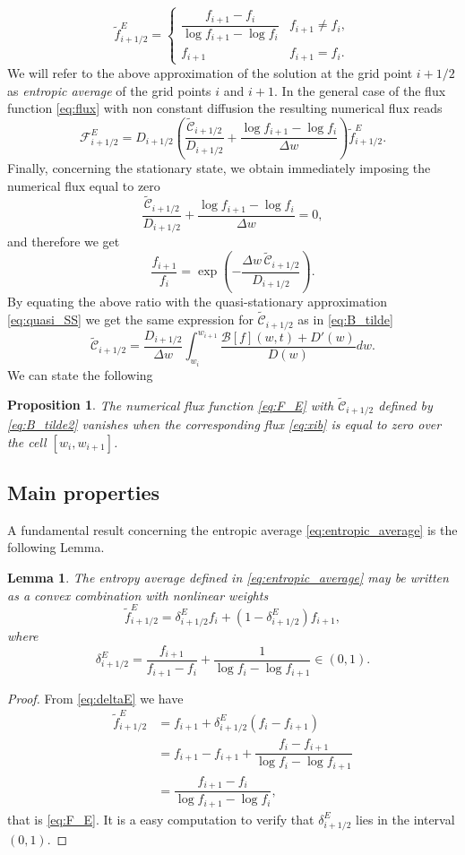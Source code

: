 \documentclass[a4paper]{article}
\newtheorem{proposition}{Proposition}
\newtheorem{lemma}{Lemma}
\theoremstyle{remark}\newtheorem{remark}{Remark}
\newcommand{\F}{\mathcal{F}}
\newcommand{\B}{\mathcal{B}}
\newcommand{\C}{\mathcal{C}}
\newcommand{\be}{\begin{equation}}
\newcommand{\ee}{\end{equation}}
\begin{document}
\be\label{eq:entropic_average}
 \tilde f^{E}_{i+1/2} =
 \begin{cases}
  \dfrac{f_{i+1}-f_i}{\log f_{i+1}-\log f_i} & f_{i+1}\ne f_i,\\
 f_{i+1} & f_{i+1}=f_i.
 \end{cases}\ee
 We will refer to the above approximation of the solution at the grid point $i+1/2$ as \emph{entropic average} of the grid points $i$ and $i+1$. In the general case of the flux function \eqref{eq:flux} with non constant diffusion the resulting numerical flux reads
\be\label{eq:F_E}
\F^E_{i+1/2} = D_{i+1/2}\left( \frac{\tilde {\C}_{i+1/2}}{D_{i+1/2}}+\dfrac{\log f_{i+1}-\log f_i}{\Delta w}  \right) \tilde f^E_{i+1/2}.
 \ee
Finally, concerning the stationary state, we obtain immediately imposing the numerical flux equal to zero
\[
\frac{\tilde {\C}_{i+1/2}}{D_{i+1/2}}+\dfrac{\log f_{i+1}-\log f_i}{\Delta w}=0,
\]  
and therefore we get
\[
\frac{f_{i+1}}{f_i} = \exp\left(-\frac{\Delta w\,\tilde {\C}_{i+1/2}}{D_{i+1/2}}\right).
\] 
By equating the above ratio with the quasi-stationary approximation \eqref{eq:quasi_SS} we get the same expression for $\tilde{\C}_{i+1/2}$ as in \eqref{eq:B_tilde}
\be\label{eq:B_tilde2}
\tilde{\C}_{i+1/2}=\dfrac{D_{i+1/2}}{\Delta w}\int_{w_i}^{w_{i+1}}\dfrac{\B[f](w,t)+D'(w)}{D(w)}dw.
\ee 
We can state the following 
\begin{proposition}
The numerical flux function \eqref{eq:F_E} with $\tilde{\C}_{i+1/2}$ defined by \eqref{eq:B_tilde2}  vanishes when the corresponding flux \eqref{eq:xib} is equal to zero over the cell $[w_i,w_{i+1}]$.  
\end{proposition}

\subsection{Main properties}
 
A fundamental result concerning the entropic average \eqref{eq:entropic_average} is the following Lemma.

 \begin{lemma}
The entropy average defined in \eqref{eq:entropic_average} may be written as a convex combination with nonlinear weights
\be
\tilde{f}^{E}_{i+1/2} = \delta_{i+1/2}^{E} f_i +(1-\delta_{i+1/2}^{E})f_{i+1},
\ee
where 
\be\label{eq:deltaE}
\delta_{i+1/2}^{E} = \dfrac{f_{i+1}}{f_{i+1}-f_i}+\dfrac{1}{\log f_i-\log f_{i+1}}\in(0,1).
\ee
 \end{lemma}
 
 \begin{proof}
 From \eqref{eq:deltaE} we have
 \[
 \begin{split}
 \tilde{f}^{E}_{i+1/2} &= f_{i+1}+\delta_{i+1/2}^{E} (f_i-f_{i+1}) \\
 &= f_{i+1}-f_{i+1}+\dfrac{f_i-f_{i+1}}{\log f_i-\log f_{i+1}} \\
 &= \dfrac{f_{i+1}-f_i}{\log f_{i+1}-\log f_i},
 \end{split}
 \]
 that is \eqref{eq:F_E}. It is a easy computation to verify that $\delta^{E}_{i+1/2}$ lies in the interval $(0,1)$.
 \end{proof}
 
\end{document}
